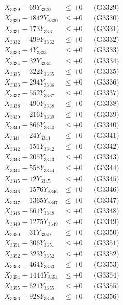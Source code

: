 \documentclass[a4paper,10pt]{article}
\begin{document}
{\begin{align}
X_{3329} - 69Y_{3329} &\leq +0 && \text{(G3329)} \\
X_{3330} - 1842Y_{3330} &\leq +0 && \text{(G3330)} \\
\allowbreak
X_{3331} - 173Y_{3331} &\leq +0 && \text{(G3331)} \\
X_{3332} - 499Y_{3332} &\leq +0 && \text{(G3332)} \\
X_{3333} - 4Y_{3333} &\leq +0 && \text{(G3333)} \\
X_{3334} - 32Y_{3334} &\leq +0 && \text{(G3334)} \\
X_{3335} - 322Y_{3335} &\leq +0 && \text{(G3335)} \\
X_{3336} - 294Y_{3336} &\leq +0 && \text{(G3336)} \\
X_{3337} - 552Y_{3337} &\leq +0 && \text{(G3337)} \\
X_{3338} - 490Y_{3338} &\leq +0 && \text{(G3338)} \\
X_{3339} - 216Y_{3339} &\leq +0 && \text{(G3339)} \\
X_{3340} - 866Y_{3340} &\leq +0 && \text{(G3340)} \\
\allowbreak
X_{3341} - 24Y_{3341} &\leq +0 && \text{(G3341)} \\
X_{3342} - 151Y_{3342} &\leq +0 && \text{(G3342)} \\
X_{3343} - 205Y_{3343} &\leq +0 && \text{(G3343)} \\
X_{3344} - 558Y_{3344} &\leq +0 && \text{(G3344)} \\
X_{3345} - 12Y_{3345} &\leq +0 && \text{(G3345)} \\
X_{3346} - 1576Y_{3346} &\leq +0 && \text{(G3346)} \\
X_{3347} - 1365Y_{3347} &\leq +0 && \text{(G3347)} \\
X_{3348} - 661Y_{3348} &\leq +0 && \text{(G3348)} \\
X_{3349} - 1275Y_{3349} &\leq +0 && \text{(G3349)} \\
X_{3350} - 31Y_{3350} &\leq +0 && \text{(G3350)} \\
\allowbreak
X_{3351} - 306Y_{3351} &\leq +0 && \text{(G3351)} \\
X_{3352} - 323Y_{3352} &\leq +0 && \text{(G3352)} \\
X_{3353} - 464Y_{3353} &\leq +0 && \text{(G3353)} \\
X_{3354} - 1444Y_{3354} &\leq +0 && \text{(G3354)} \\
X_{3355} - 621Y_{3355} &\leq +0 && \text{(G3355)} \\
X_{3356} - 928Y_{3356} &\leq +0 && \text{(G3356)} \\

\end{align}}
\end{document}
